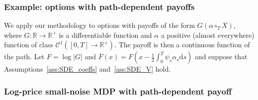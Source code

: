 \documentclass{amsart}[11pt]
\numberwithin{equation}{section}
\numberwithin{theorem}{subsection}
\numberwithin{proposition}{subsection}
\numberwithin{definition}{subsection}
\numberwithin{lemma}{subsection}
\numberwithin{assumption}{subsection}
\newcommand{\Cc}{\mathcal{C}}
\newcommand{\RR}{\mathbb{R}}
\newcommand{\R}{\RR}
\newcommand{\cT}{\circ_{T}}
\newcommand{\D}{\mathrm{d}}
\begin{document}

\subsubsection{Example: options with path-dependent payoffs}
We apply our methodology to options with payoffs of the form $G(\alpha \cT X)$, where $G:\R \rightarrow \R^{+}$ is a differentiable function and $\alpha$ a positive (almost everywhere) function of class $\Cc^1([0,T]\to\R^{+})$. The payoff is then a continuous function of the path. 
Let $F = \log|G|$ and $\overline{F}(x) = F(x-\frac{1}{2}\int_0^T\psi_s\alpha_s \D s)$ and suppose that Assumptions~\ref{ass:SDE_coeffs} and~\ref{ass:SDE_V} hold.


\subsubsection{Log-price small-noise MDP with path-dependent payoff}
\end{document}

